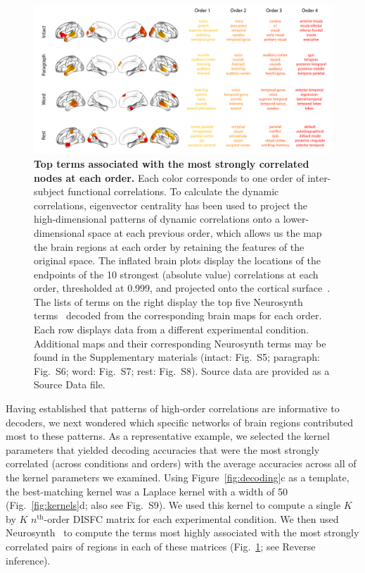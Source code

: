 \documentclass[english]{article}
\newcommand{\intact}{S5}
\newcommand{\para}{S6}
\newcommand{\word}{S7}
\newcommand{\rest}{S8}
\newcommand{\pca}{S9}
\begin{document}
\begin{figure}[tp]
  \centering
  \includegraphics[width=\textwidth]{figs/most_abs}
  \caption{\textbf{Top terms associated with the most strongly
       correlated nodes at each order.}  Each color corresponds to one order of
    inter-subject functional correlations.  To calculate the dynamic
    correlations, eigenvector centrality has been used to project
    the high-dimensional patterns of dynamic correlations onto a
    lower-dimensional space at each previous order, which allows us
    the map the brain regions at each order by retaining the
    features of the original space. The inflated brain plots
    display the locations of the endpoints of the 10 strongest
    (absolute value) correlations at each order, thresholded at 0.999,
    and projected onto the cortical surface~\cite{CombEtal19}.  The
    lists of terms on the right display the top five Neurosynth
    terms~\cite{RubiEtal17} decoded from the corresponding brain maps
    for each order.  Each row displays data from a different
    experimental condition.  Additional maps and their corresponding
    Neurosynth terms may be found in the Supplementary
      materials (intact: Fig.~\intact; paragraph: Fig.~\para; word:
    Fig.~\word; rest: Fig.~\rest). Source data are provided as a Source Data file.}
  \label{fig:neurosynth}
\end{figure}

Having established that patterns of high-order correlations are
informative to decoders, we next wondered which specific networks of
brain regions contributed most to these patterns.  As a representative
example, we selected the kernel parameters that yielded decoding
accuracies that were the most strongly correlated (across conditions
and orders) with the average accuracies across all of the
kernel parameters we examined.  Using Figure~\ref{fig:decoding}c as a
template, the best-matching kernel was a Laplace kernel with a width
of 50 (Fig.~\ref{fig:kernels}d; also see Fig.~\pca).  We used this kernel to compute a
single $K$ by $K$ $n^\mathrm{th}$-order DISFC matrix for each
experimental condition.  We then used Neurosynth~\cite{RubiEtal17} to
compute the terms most highly associated with the most strongly
correlated pairs of regions in each of these matrices
(Fig.~\ref{fig:neurosynth}; see Reverse inference).
\end{document}
